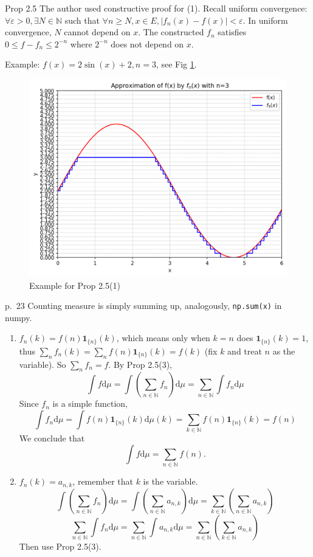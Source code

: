 \begin{note}{Prop 2.5}
    The author used constructive proof for (1). Recall uniform convergence: $\forall \varepsilon>0,\exists N\in\mathbb{N}$ such that $\forall n\ge N, x\in E, |f_n(x)-f(x)|<\varepsilon$. In uniform convergence, $N$ cannot depend on $x$. The constructed $f_n$ satisfies $0\le f-f_n\le 2^{-n}$ where $2^{-n}$ does not depend on $x$. 

    Example: $f(x)=2\sin(x)+2,n=3$, see Fig \ref{fig:prop2.5}.
    \begin{figure}[htbp]
        \centering
        \includegraphics[width=0.6\linewidth]{fig/prop2-5.png}
        \caption{Example for Prop 2.5(1)}
        \label{fig:prop2.5}
    \end{figure}
\end{note}

\begin{note}{p.~23}
    Counting measure is simply summing up, analogously, \texttt{np.sum(x)} in numpy. 
    \begin{enumerate}
        \item $f_n(k)=f(n)\mathbf{1}_{\{n\}}(k)$, which means only when $k=n$ does $\mathbf{1}_{\{n\}}(k)=1$, thus $\sum_n f_n(k)=\sum_n f(n)\mathbf{1}_{\{n\}}(k)=f(k)$ (fix $k$ and treat $n$ as the variable). So $\sum_n f_n=f$. By Prop 2.5(3),
        \[
        \int f\mathrm{d}\mu=\int \left(\sum_{n\in\mathbb{N}}f_n\right)\mathrm{d}\mu=\sum_{n\in\mathbb{N}}\int f_n\mathrm{d}\mu
        \]
        Since $f_n$ is a simple function,
        $$
        \int f_n\mathrm{d}\mu=\int f(n)\mathbf{1}_{\{n\}}(k)\mathrm{d}\mu(k)=\sum_{k\in\mathbb{N}}f(n)\mathbf{1}_{\{n\}}(k)=f(n)
        $$
        We conclude that
        \[
        \int f\mathrm{d}\mu=\sum_{n\in\mathbb{N}}f(n).
        \]
        \item $f_n(k)=a_{n,k}$, remember that $k$ is the variable.
        \[
        \int\left(\sum_{n\in\mathbb{N}}f_n\right)\mathrm{d}\mu=
        \int\left(\sum_{n\in\mathbb{N}}a_{n,k}\right)\mathrm{d}\mu=
        \sum_{k\in\mathbb{N}}\left(\sum_{n\in\mathbb{N}}a_{n,k}\right)
        \]
        \[
        \sum_{n\in\mathbb{N}}\int f_n\mathrm{d}\mu=
        \sum_{n\in\mathbb{N}}\int a_{n,k}\mathrm{d}\mu=
        \sum_{n\in\mathbb{N}}\left(\sum_{k\in\mathbb{N}}a_{n,k}\right)
        \]
        Then use Prop 2.5(3).
    \end{enumerate}
\end{note}


